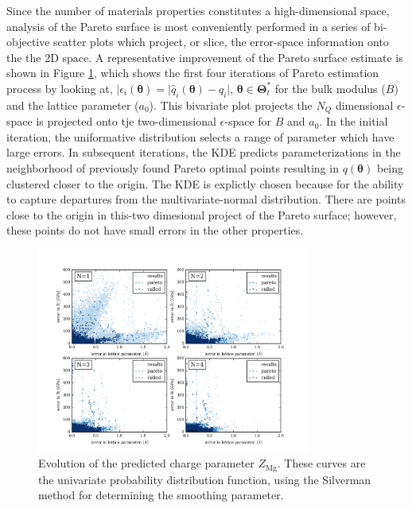 Since the number of materials properties constitutes a high-dimensional space, analysis of the Pareto surface is most conveniently performed in a series of bi-objective scatter plots which project, or slice, the error-space information onto the the 2D space.  A representative improvement of the Pareto surface estimate is shown in Figure \ref{fig:MgO_biobjective_evolution}, which shows the first four iterations of Pareto estimation process by looking at,
$|\epsilon_i(\bm{\theta})=|\hat{q}_i(\bm{\theta})-q_i|$, $\bm{\theta}\in\bm{\Theta}_t^*$ for the bulk modulus ($B$) and the lattice parameter ($a_0$).  This bivariate plot projects the $N_Q$ dimensional $\epsilon$-space is projected onto tje two-dimensional $\epsilon$-space for $B$ and $a_0$. In the initial iteration, the uniformative distribution selects a range of parameter which have large errors.  In subsequent iterations, the KDE predicts parameterizations in the neighborhood of previously found Pareto optimal points resulting in $q(\bm{\theta})$ being clustered closer to the origin.   The KDE is explictly chosen because for the ability to capture departures from the multivariate-normal distribution.  There are points close to the origin in this-two dimesional project of the Pareto surface; however, these points do not have small errors in the other properties.

\begin{figure}[ht]
	\centering
  \includegraphics[width=0.8\textwidth]{chapter7/MgO_biobjective_evolution}
  \caption{Evolution of the predicted charge parameter $Z_{\text{Mg}}$.  These curves are the univariate probability distribution function, using the Silverman method for determining the smoothing parameter.}
  \label{fig:MgO_biobjective_evolution}
\end{figure}

